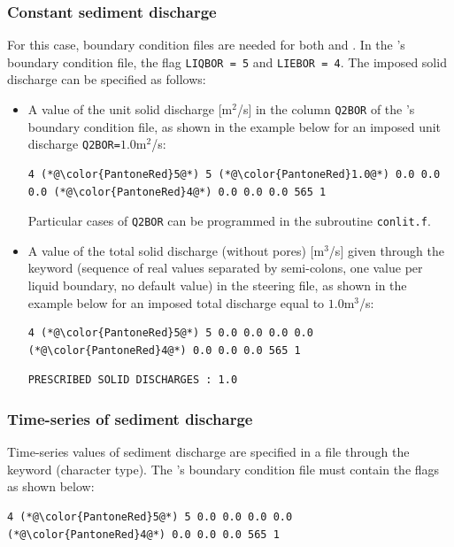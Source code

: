\subsubsection{Constant sediment discharge}
For this case, boundary condition files are needed for both  and \sisyphe{}. In the \sisyphe{}'s boundary condition file, the flag \texttt{LIQBOR = 5} and \texttt{LIEBOR = 4}. The imposed solid discharge can be specified as follows:
\begin{itemize}
\item A value of the unit solid discharge [m$^2$/s] in the column \texttt{Q2BOR} of the \sisyphe{}'s boundary condition file, as shown in the example below for an imposed unit discharge \texttt{Q2BOR=}$1.0$m$^2$/s:
\begin{lstlisting}[frame=trBL]
4 (*@\color{PantoneRed}5@*) 5 (*@\color{PantoneRed}1.0@*) 0.0 0.0 0.0 (*@\color{PantoneRed}4@*) 0.0 0.0 0.0 565 1
\end{lstlisting}

Particular cases of \texttt{Q2BOR} can be programmed in the subroutine \texttt{conlit.f}.
  
\item A value of the total solid discharge (without pores) [m$^3$/s] given through the keyword  (sequence of real values separated by semi-colons, one value per liquid boundary, no default value) in the steering file, as shown in the example below for an imposed total discharge equal to $1.0$m$^3$/s:
\begin{lstlisting}[frame=trBL]
4 (*@\color{PantoneRed}5@*) 5 0.0 0.0 0.0 0.0 (*@\color{PantoneRed}4@*) 0.0 0.0 0.0 565 1
\end{lstlisting}

\begin{lstlisting}[frame=trBL]
PRESCRIBED SOLID DISCHARGES : 1.0
\end{lstlisting}
 
\end{itemize}

\subsubsection{Time-series of sediment discharge}
Time-series values of sediment discharge are specified in a file through the keyword  (character type). The \sisyphe{}'s boundary condition file must contain the flags as shown below:
\begin{lstlisting}[frame=trBL]
4 (*@\color{PantoneRed}5@*) 5 0.0 0.0 0.0 0.0 (*@\color{PantoneRed}4@*) 0.0 0.0 0.0 565 1
\end{lstlisting}

